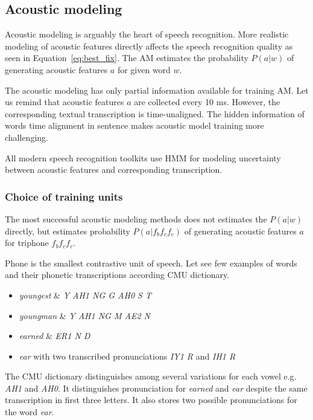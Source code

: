 {


\subsection{Acoustic modeling}
\label{sub:am}
Acoustic modeling is arguably the heart of speech recognition.
More realistic modeling of acoustic features directly affects the speech recognition quality 
as seen in Equation~\ref{eq:best_fix}. 
The \ac{AM} estimates the probability $P(a|w)$ of generating acoustic features $a$
for given word $w$.

The acoustic modeling has only partial information available for training \ac{AM}.
Let us remind that acoustic features $a$ are collected every 10 ms.
However, the corresponding textual transcription is time-unaligned.
The hidden information of words time alignment in sentence
makes acoustic model training more challenging.

All modern speech recognition toolkits use \acl{HMM}\cite{TODO}
for modeling uncertainty between acoustic features and corresponding transcription. 

\subsubsection*{Choice of training units}
The most successful acoustic modeling methods does not estimates the $P(a|w)$ directly,
but estimates probability $P(a|f_{b}f_{c}f_{c})$ of generating acoustic features $a$ for triphone $f_{b}f_{c}f_{c}$.

Phone is the smallest contrastive unit of speech. 
Let see few examples of words and their phonetic transcriptions according CMU dictionary\cite{TODO}.
\begin{itemize}
    \item {\it youngest} \& {\it  Y AH1 NG G AH0 S T }
    \item {\it youngman} \& {\it  Y AH1 NG M AE2 N }
    \item {\it earned} \& {\it ER1 N D}
    \item {\it ear}\/ with two transcribed pronunciations {\it IY1 R}\/ and {\it IH1 R}
\end{itemize}
The CMU dictionary distinguishes among several variations for each vowel e.g. {\it AH1}\/ and {\it AH0}.
It distinguishes pronunciation for {\it earned}\/ and {\it ear}\/
despite the same transcription in first three letters.
It also stores two possible pronunciations for the word {\it ear}.

}
